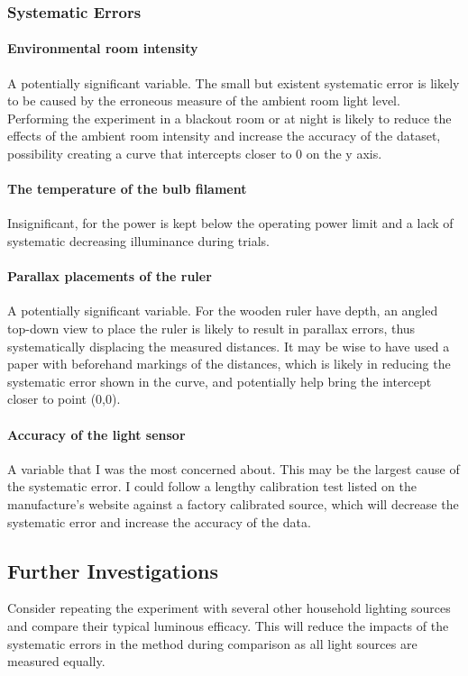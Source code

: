 \documentclass[a4paper,12pt]{article}
\begin{document}
\subsubsection{Systematic Errors}
\paragraph{Environmental room intensity}
A potentially significant variable. The small but existent systematic error is likely to be caused by the erroneous measure of the ambient room light level. Performing the experiment in a blackout room or at night is likely to reduce the effects of the ambient room intensity and increase the accuracy of the dataset, possibility creating a curve that intercepts closer to 0 on the y axis.

\paragraph{The temperature of the bulb filament}
Insignificant, for the power is kept below the operating power limit and a lack of systematic decreasing illuminance during trials.

\paragraph{Parallax placements of the ruler}
A potentially significant variable. For the wooden ruler have depth, an angled top-down view to place the ruler is likely to result in parallax errors, thus systematically displacing the measured distances. It may be wise to have used a paper with beforehand markings of the distances, which is likely in reducing the systematic error shown in the curve, and potentially help bring the intercept closer to point (0,0).

\paragraph{Accuracy of the light sensor}
A variable that I was the most concerned about. This may be the largest cause of the systematic error. I could follow a lengthy calibration test listed on the manufacture's website against a factory calibrated source, which will decrease the systematic error and increase the accuracy of the data.

\subsection{Further Investigations}
Consider repeating the experiment with several other household lighting sources and compare their typical luminous efficacy. This will reduce the impacts of the systematic errors in the method during comparison as all light sources are measured equally.

\newpage
\printbibliography
\end{document}
